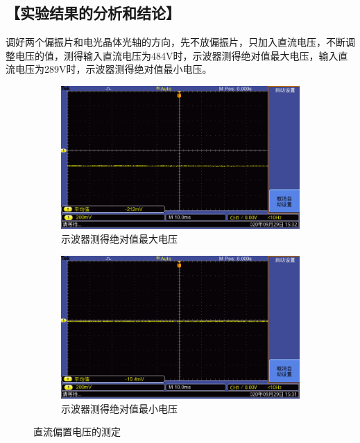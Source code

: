 \documentclass{ctexart}
\let\oldsubsection\subsection
\renewcommand{\subsection}[1]{\oldsubsection{\!\!\!\!\!\!【#1】}}
\begin{document}
\subsection{实验结果的分析和结论}


调好两个偏振片和电光晶体光轴的方向，先不放偏振片，只加入直流电压，不断调整电压的值，测得输入直流电压为484V时，示波器测得绝对值最大电压，输入直流电压为289V时，示波器测得绝对值最小电压。

\begin{figure}[H]
  \centering
  \begin{subfigure}{.48\textwidth}
    \centering
    \includegraphics[width=\linewidth]{晶体电光调制图像/没有波片/最大484V/F0001TEK}
    \caption{示波器测得绝对值最大电压}
  \end{subfigure}
  \begin{subfigure}{.48\textwidth}
    \centering
    \includegraphics[width=\linewidth]{晶体电光调制图像/没有波片/最小289V/F0000TEK}
    \caption{示波器测得绝对值最小电压}
  \end{subfigure}
  \caption{直流偏置电压的测定}
\end{figure}
\end{document}
